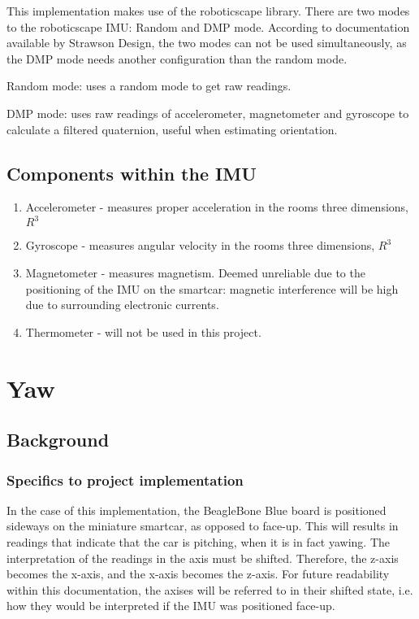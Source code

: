 \documentclass[12pt]{article}
\begin{document}
This implementation makes use of the roboticscape library. There are two modes to the roboticscape IMU: Random and DMP mode. According to documentation available by Strawson Design, the two modes can not be used simultaneously, as the DMP mode needs another configuration than the random mode.

Random mode: uses a random mode to get raw readings.
 
DMP mode: uses raw readings of accelerometer, magnetometer and gyroscope to calculate a filtered quaternion, useful when estimating orientation.


\subsection{Components within the IMU}  

\begin{enumerate}  
\item Accelerometer - measures proper acceleration in the rooms three dimensions, $R^3$  
\item Gyroscope - measures angular velocity in the rooms three dimensions, $R^3$ 
\item Magnetometer - measures magnetism. Deemed unreliable due to the positioning of the IMU on the smartcar: magnetic interference will be high due to surrounding electronic currents.   
\item Thermometer - will not be used in this project.
\end{enumerate}

\section{Yaw}

\subsection{Background}

\subsubsection{Specifics to project implementation}
In the case of this implementation, the BeagleBone Blue board is positioned sideways on the miniature smartcar, as opposed to face-up. This will results in readings that indicate that the car is pitching, when it is in fact yawing. The interpretation of the readings in the axis must be shifted. Therefore, the z-axis becomes the x-axis, and the x-axis becomes the z-axis. For future readability within this documentation, the axises will be referred to in their shifted state, i.e. how they would be interpreted if the IMU was positioned face-up. 
\end{document}
